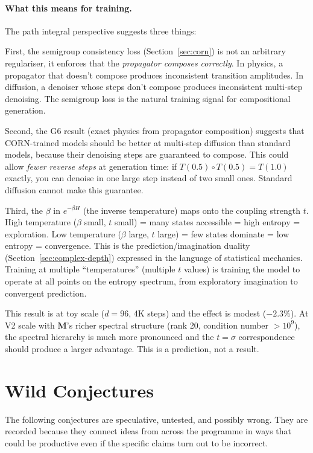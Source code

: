 \documentclass[11pt, a4paper]{article}
\newcommand{\M}{\mathbf{M}}
\theoremstyle{plain}
\theoremstyle{remark}
\begin{document}
\paragraph{What this means for training.}
The path integral perspective suggests three things:

First, the semigroup consistency loss (Section~\ref{sec:corn}) is not an arbitrary regulariser, it enforces that the \emph{propagator composes correctly}.  In physics, a propagator that doesn't compose produces inconsistent transition amplitudes.  In diffusion, a denoiser whose steps don't compose produces inconsistent multi-step denoising.  The semigroup loss is the natural training signal for compositional generation.

Second, the G6 result (exact physics from propagator composition) suggests that CORN-trained models should be better at multi-step diffusion than standard models, because their denoising steps are guaranteed to compose.  This could allow \emph{fewer reverse steps} at generation time: if $T(0.5) \circ T(0.5) = T(1.0)$ exactly, you can denoise in one large step instead of two small ones.  Standard diffusion cannot make this guarantee.

Third, the $\beta$ in $e^{-\beta H}$ (the inverse temperature) maps onto the coupling strength $t$.  High temperature ($\beta$ small, $t$ small) = many states accessible = high entropy = exploration.  Low temperature ($\beta$ large, $t$ large) = few states dominate = low entropy = convergence.  This is the prediction/imagination duality (Section~\ref{sec:complex-depth}) expressed in the language of statistical mechanics.  Training at multiple ``temperatures'' (multiple $t$ values) is training the model to operate at all points on the entropy spectrum, from exploratory imagination to convergent prediction.

\medskip
\noindent
This result is at toy scale ($d{=}96$, 4K steps) and the effect is modest ($-2.3\%$).
At V2 scale with $\M$'s richer spectral structure (rank 20, condition number $>10^9$), the spectral hierarchy is much more pronounced and the $t{=}\sigma$ correspondence should produce a larger advantage.
This is a prediction, not a result.

\section{Wild Conjectures}\label{sec:wild}

The following conjectures are speculative, untested, and possibly wrong.
They are recorded because they connect ideas from across the programme in ways that could be productive even if the specific claims turn out to be incorrect.
\end{document}

